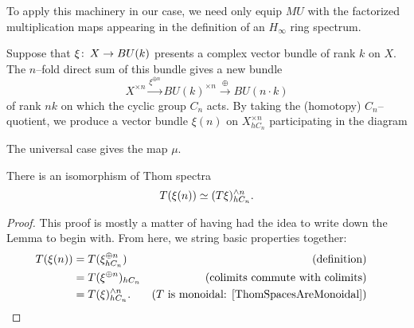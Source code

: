 To apply this machinery in our case, we need only equip $MU$ with the factorized multiplication maps appearing in the definition of an $H_\infty$ ring spectrum.

\begin{definition}
Suppose that $\xi\colon\thinspace X \to BU(k)$ presents a complex vector bundle of rank $k$ on $X$.  The $n$--fold direct sum of this bundle gives a new bundle \[X^{\times n} \xrightarrow{\xi^{\oplus n}} BU(k)^{\times n} \xrightarrow{\oplus} BU(n \cdot k)\] of rank $nk$ on which the cyclic group $C_n$ acts.  By taking the (homotopy) $C_n$--quotient, we produce a vector bundle $\xi(n)$ on $X^{\times n}_{hC_n}$ participating in the diagram
\begin{center}
\end{center}
The universal case gives the map $\mu$.
\end{definition}

\begin{lemma}
There is an isomorphism of Thom spectra \[T(\xi(n)) \simeq (T\xi)^{\wedge n}_{hC_n}.\]
\end{lemma}
\begin{proof}
This proof is mostly a matter of having had the idea to write down the Lemma to begin with.  From here, we string basic properties together:
\begin{align*}
T(\xi(n)) & = T(\xi^{\oplus n}_{hC_n}) & \text{(definition)} \\
& = T(\xi^{\oplus n})_{hC_n} & \text{(colimits commute with colimits)} \\
& = T(\xi)^{\sm n}_{hC_n}. & \text{($T$ is monoidal: \Cref{ThomSpacesAreMonoidal})} & \qedhere
\end{align*}
\end{proof}


